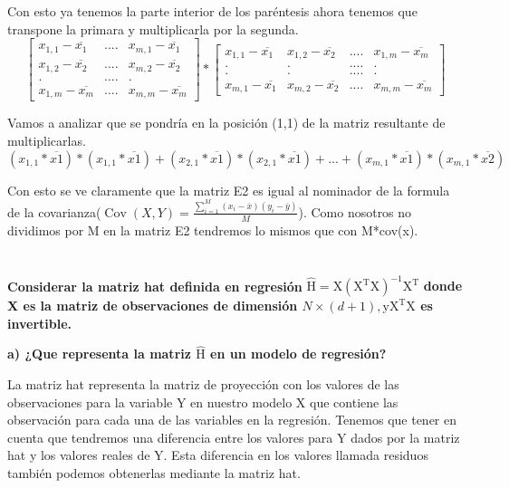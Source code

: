 \documentclass[titlepage]{article}
\begin{document}
  	Con esto ya tenemos la parte interior de los paréntesis ahora tenemos que transpone la primara y multiplicarla por la segunda.
  	\[
  	\begin{bmatrix}
  		x_{1,1} - \overline{x_1} & .... & x_{m,1}-\overline{x_1} \\
  		x_{1,2}-\overline{x_2} & .... & x_{m,2}-\overline{x_2}\\	
  		. &  .... & .\\	
  		x_{1,m} -\overline{x_m} &  .... & x_{m,m}-\overline{x_m}
  	\end{bmatrix}  	
  	*
  	\begin{bmatrix}
  	x_{1,1} - \overline{x_1} & x_{1,2}-\overline{x_2} & .... & x_{1,m} -\overline{x_m} \\
  	. & . & .... & .\\	
  	. & . & .... & .\\	
  	x_{m,1}-\overline{x_1} & x_{m,2}-\overline{x_2} & .... & x_{m,m}-\overline{x_m}
  	\end{bmatrix} 
  	\]
  	
  	Vamos a analizar que se pondría en la posición (1,1) de la matriz resultante de multiplicarlas.
  	$$
  	(x_{1,1} * \overline{x1}) * (x_{1,1} * \overline{x1}) +  (x_{2,1} * \overline{x1}) * (x_{2,1} * \overline{x1}) + ... + (x_{m,1} * \overline{x1}) * (x_{m,1} * \overline{x2})
  	$$
  	
  	Con esto se ve claramente que la matriz E2 es igual al nominador de la formula de la covarianza($\operatorname{Cov}(X, Y)=\frac{\sum_{i=1}^{M}\left(x_{i}-\overline{x}\right)\left(y_{i}-\overline{y}\right)}{M}$). Como nosotros no dividimos por M en la matriz E2 tendremos lo mismos que con M*cov(x).
  	
  	\section{}\textbf{Considerar la matriz hat definida en regresión } $\hat{\mathrm{H}}=\mathrm{X}\left(\mathrm{X}^{\mathrm{T}} \mathrm{X}\right)^{-1} \mathrm{X}^{\mathrm{T}}$
	\textbf{donde X es la matriz de observaciones de dimensión $N \times(d+1), \mathrm{y} \mathrm{X}^{\mathrm{T}} \mathrm{X}$ es invertible.}
	
	\textbf{a) ¿Que representa la matriz $\hat{\mathrm{H}}$ en un modelo de regresión?}
	
  	La matriz hat representa la matriz de proyección con los valores de las observaciones para la variable Y en nuestro modelo X que contiene las observación para cada una de las variables en la regresión. Tenemos que tener en cuenta que tendremos una diferencia entre los valores para Y dados por la matriz hat  y  los valores reales de Y. Esta diferencia en los valores llamada residuos también podemos obtenerlas mediante la matriz hat.  	
  	\newline
  	
\end{document}
